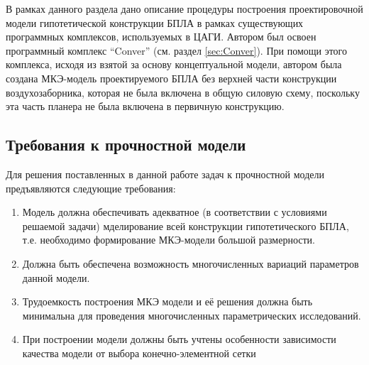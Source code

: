 
В рамках данного раздела дано описание процедуры построения проектировочной модели гипотетической конструкции БПЛА в рамках существующих программных комплексов, используемых в ЦАГИ. Автором был освоен программный комплекс ``Conver'' (см. раздел \ref{sec:Conver}). 
При помощи этого комплекса, исходя из взятой за основу концептуальной модели, автором была создана МКЭ-модель проектируемого БПЛА без верхней части конструкции воздухозаборника, которая не была включена в общую силовую схему, поскольку эта часть планера не была включена в первичную конструкцию.




\subsection{Требования к прочностной модели}

Для решения поставленных в данной работе задач к прочностной модели предъявляются следующие требования:



\begin{enumerate}
\item Модель должна обеспечивать адекватное (в соответствии с условиями решаемой задачи) мделирование всей конструкции гипотетического БПЛА, т.е. необходимо формирование МКЭ-модели большой размерности.
\item Должна быть обеспечена возможность многочисленных вариаций параметров данной модели.
\item Трудоемкость построения МКЭ модели и её решения должна быть минимальна для проведения многочисленных параметрических исследований.
\item При построении модели должны быть учтены особенности зависимости качества модели от выбора конечно-элементной сетки
\end{enumerate}

